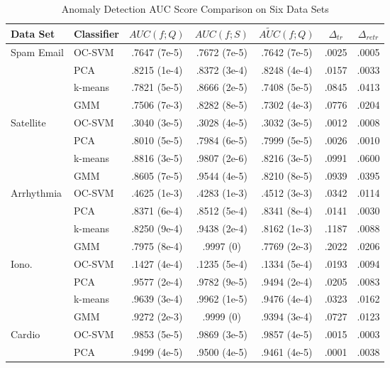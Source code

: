 \documentclass[10pt,a4paper,conference]{IEEEtran}
\begin{document}
\begin{table*}[t!]
\renewcommand{\arraystretch}{1.3} 
\caption{Anomaly Detection AUC Score Comparison on Six Data Sets}
\centering
\begin{threeparttable}
\begin{tabular}{llccccc} %
\bf Data Set & \bf Classifier & \bf $AUC(f; Q)$
& \bf $AUC(f; S)$ & \bf $\widetilde{AUC}(f; Q)$
&  $\Delta_{tr}$ & $\Delta_{retr}$ \\ \hline 
Spam Email & OC-SVM  & .7647 (7e-5) & .7672 (7e-5) 
& .7642 (7e-5) & .0025 & .0005  \\ 
\ & PCA & .8215 (1e-4) & .8372 (3e-4) & .8248 (4e-4) & .0157 & .0033  \\ 
\ & k-means & .7821 (5e-5) & .8666 (2e-5) & .7408 (5e-5) & .0845 & .0413  \\ 
\ & GMM & .7506 (7e-3) & .8282 (8e-5) & .7302 (4e-3) & .0776 & .0204  \\ \hline 
Satellite & OC-SVM & .3040 (3e-5) & .3028 (4e-5) & .3032 (3e-5) & .0012 & .0008  \\ 
\ & PCA & .8010 (5e-5) & .7984 (6e-5) & .7999 (5e-5) & .0026 & .0010  \\ 
\ & k-means & .8816 (3e-5) & .9807 (2e-6) & .8216 (3e-5) & .0991 & .0600 \\ 
\ & GMM & .8605 (7e-5) & .9544 (4e-5) & .8210 (8e-5) & .0939 & .0395 \\ \hline 
Arrhythmia & OC-SVM & .4625 (1e-3) & .4283 (1e-3) & .4512 (3e-3) & .0342 & .0114  \\ 
\ & PCA & .8371 (6e-4) & .8512 (5e-4) & .8341 (8e-4) & .0141 & .0030 \\ 
\ & k-means & .8250 (9e-4) & .9438 (2e-4) & .8162 (1e-3) & .1187 & .0088 \\ 
\ & GMM & .7975 (8e-4) & .9997 (0) & .7769 (2e-3) & .2022 & .0206 \\ \hline 
Iono. & OC-SVM & .1427 (4e-4) & .1235 (5e-4) & .1334 (5e-4) 
& .0193 & .0094  \\ 
\ & PCA & .9577 (2e-4) & .9782 (9e-5) & .9494 (2e-4) & .0205 & .0083 \\ 
\ & k-means & .9639 (3e-4) & .9962 (1e-5) & .9476 (4e-4) & .0323 & .0162 \\ 
\ & GMM & .9272 (2e-3) & .9999 (0) & .9394 (3e-4) & .0727 & .0123 \\ \hline 
Cardio & OC-SVM& .9853 (5e-5) & .9869 (3e-5) & .9857 (4e-5) & .0015 & .0003  \\ 
\ & PCA & .9499 (4e-5) & .9500 (4e-5) & .9461 (4e-5) & .0001 & .0038  \\ 

\end{tabular}
\end{threeparttable}
\end{table*}
\end{document}
